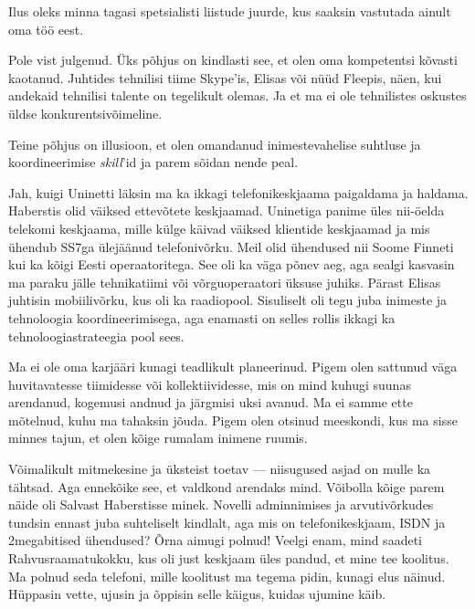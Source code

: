 
Ilus oleks minna tagasi spetsialisti liistude juurde, kus saaksin 
vastutada ainult oma töö eest. 


Pole vist julgenud. Üks põhjus on kindlasti see, et olen oma kompetentsi 
kõvasti kaotanud. Juhtides 
tehnilisi tiime Skype'is, Elisas või nüüd Fleepis, näen, kui andekaid tehnilisi talente on tegelikult olemas. Ja et ma ei ole
tehnilistes oskustes üldse konkurentsivõimeline.


Teine põhjus on illusioon, et olen omandanud inimestevahelise suhtluse ja 
koordineerimise \emph{skill}'id ja 
parem sõidan nende peal.


Jah, kuigi Uninetti läksin ma ka ikkagi telefonikeskjaama paigaldama ja haldama. Haberstis olid väiksed ettevõtete keskjaamad. Uninetiga panime üles nii-öelda telekomi keskjaama, 
mille külge käivad väiksed klientide keskjaamad ja mis 
ühendub SS7ga ülejäänud telefonivõrku. Meil olid ühendused nii Soome 
Finneti kui ka kõigi Eesti operaatoritega. See oli ka väga põnev aeg, aga sealgi kasvasin ma 
paraku jälle tehnikatiimi või võrguoperaatori üksuse 
juhiks. Pärast Elisas juhtisin mobiilivõrku, kus oli ka raadiopool. 
Sisuliselt oli tegu juba inimeste ja tehnoloogia koordineerimisega, aga enamasti on selles 
rollis ikkagi ka tehnoloogiastrateegia pool sees. 


Ma ei ole oma karjääri kunagi teadlikult planeerinud. Pigem olen sattunud väga huvitavatesse tiimidesse 
või kollektiividesse, mis on mind kuhugi suunas arendanud, 
kogemusi andnud ja järgmisi uksi avanud. Ma ei samme ette mõtelnud, 
kuhu ma tahaksin jõuda. Pigem olen otsinud meeskondi, kus ma 
sisse minnes tajun, et olen kõige rumalam inimene ruumis. 


Võimalikult mitmekesine ja üksteist toetav --- 
niisugused asjad on mulle ka tähtsad. Aga ennekõike see, et valdkond arendaks mind. Võibolla kõige parem 
näide oli Salvast Haberstisse minek. Novelli adminnimises ja 
arvutivõrkudes tundsin ennast juba suhteliselt kindlalt, aga mis on telefonikeskjaam, ISDN ja 2megabitised ühendused? Õrna aimugi 
polnud! Veelgi enam, mind saadeti Rahvusraamatukokku, kus oli just keskjaam 
üles pandud, et mine tee koolitus. Ma polnud seda telefoni, mille koolitust ma tegema pidin, kunagi elus näinud. Hüppasin vette, ujusin ja õppisin selle käigus, kuidas ujumine käib. 

